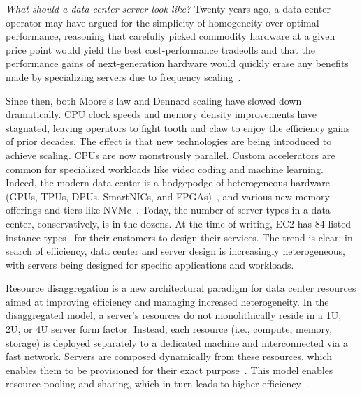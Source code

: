 \documentclass[12pt]{ucsddissertation}
\begin{document}
\begin{dissertationintroduction}


\textit{What should a data center server look like?} Twenty years ago, a data center operator may
have argued for the simplicity of homogeneity over optimal performance, reasoning that carefully
picked commodity hardware at a given price point would yield the best cost-performance tradeoffs and that the
performance gains of next-generation hardware would quickly erase any benefits made by specializing
servers due to frequency scaling~\cite{moore}.

Since then, both Moore's law and Dennard scaling have slowed down dramatically. CPU clock speeds and
memory density improvements have stagnated, leaving operators to fight tooth and claw to enjoy the
efficiency gains of prior decades. The effect is that new technologies are being introduced to
achieve scaling. CPUs are now monstrously parallel. Custom accelerators are common for specialized
workloads like video coding and machine learning. Indeed, the modern data center is a hodgepodge of
heterogeneous hardware (GPUs, TPUs, DPUs, SmartNICs, and
FPGAs)~\cite{dsnf,azure-smartnic,tpu,nitro}, and various new memory offerings and tiers like
NVMe~\cite{decible}. Today, the number of server types in a data center, conservatively, is in the
dozens. At the time of writing, EC2 has 84 listed instance types~\cite{ec2-offer} for their
customers to design their services. The trend is clear: in search of efficiency, data center and
server design is increasingly heterogeneous, with servers being designed for specific applications
and workloads.

Resource disaggregation is a new architectural paradigm for data center resources aimed at improving
efficiency and managing increased heterogeneity. In the disaggregated model, a server's resources do
not monolithically reside in a 1U, 2U, or 4U server form factor. Instead, each resource (i.e.,
compute, memory, storage) is deployed separately to a dedicated machine and interconnected via a
fast network. Servers are composed dynamically from these resources, which enables them to be
provisioned for their exact purpose~\cite{dis-and-app,infiniswap,blade-server,decible,legoos}. This
model enables resource pooling and sharing, which in turn leads to higher
efficiency~\cite{regions,fastswap,dsnf,aifm,supernic,ditto}.




\end{dissertationintroduction}
\end{document}
